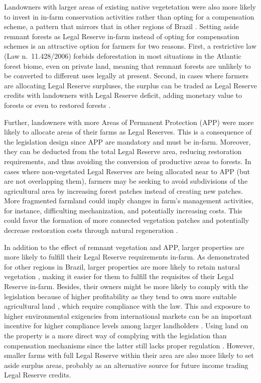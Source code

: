 \documentclass[
	12pt,				%
	oneside,			%
	a4paper,			%
	chapter=TITLE,		%
	section=TITLE,		%
	brazil,			%
	english				%
	]{abntex2}
\begin{document}
Landowners with larger areas of existing native vegetetation were also more likely to invest in in-farm conservation activities rather than opting for a compensation scheme, a pattern that mirrors that in other regions of Brazil \autocite{jung_brazils_2017}. Setting aside remnant forests as Legal Reserve in-farm instead of opting for compensation schemes is an attractive option for farmers for two reasons. First, a restrictive law (Law n.~11.428/2006) forbids deforestation in most situations in the Atlantic forest biome, even on private land, meaning that remnant forests are unlikely to be converted to different uses legally at present. Second, in cases where farmers are allocating Legal Reserve surpluses, the surplus can be traded as Legal Reserve credits with landowners with Legal Reserve deficit, adding monetary value to forests or even to restored forests \autocite{soares-filho_cracking_2014}.

Further, landowners with more Areas of Permanent Protection (APP) were more likely to allocate areas of their farms as Legal Reserves. This is a consequence of the legislation design since APP are mandatory and must be in-farm. Moreover, they can be deducted from the total Legal Reserve area, reducing restoration requirements, and thus avoiding the conversion of productive areas to forests. In cases where non-vegetated Legal Reserves are being allocated near to APP (but are not overlapping them), farmers may be seeking to avoid subdivisions of the agricultural area by increasing forest patches instead of creating new patches. More fragmented farmland could imply changes in farm's management activities, for instance, difficulting mechanization, and potentially increasing costs. This could favor the formation of more connected vegetation patches and potentially decrease restoration costs through natural regeneration \autocite{crouzeilles_global_2016}.

In addition to the effect of remnant vegetation and APP, larger properties are more likely to fulfill their Legal Reserve requirements in-farm. As demonstrated for other regions in Brazil, larger properties are more likely to retain natural vegetation \autocite{michalski_rural_2010,stefanes_property_2018}, making it easier for them to fulfill the requisites of their Legal Reserve in-farm. Besides, their owners might be more likely to comply with the legislation because of higher profitability \autocite{michalski_rural_2010} as they tend to own more suitable agricultural land \autocite{castro_rural_2012,rada_agricultural_2019}, which require compliance with the law. This and exposure to higher environmental exigencies from international markets can be an important incentive for higher compliance levels among larger landholders \autocite{rajao_rotten_2020}. Using land on the property is a more direct way of complying with the legislation than compensation mechanisms since the latter still lacks proper regulation \autocite{mello_integrating_nodate}. However, smaller farms with full Legal Reserve within their area are also more likely to set aside surplus areas, probably as an alternative source for future income trading Legal Reserve credits.
\end{document}
